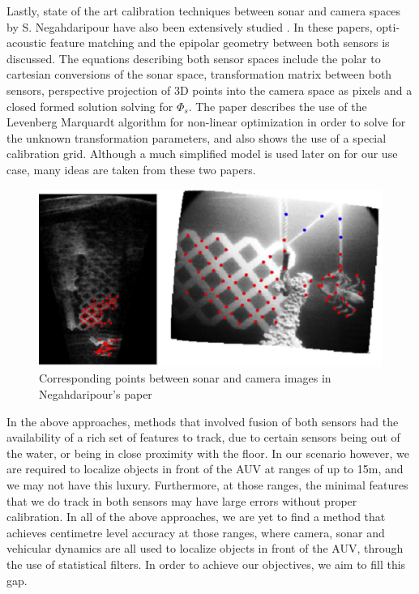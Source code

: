 \documentclass[15pt]{article}
\let\Phi\varPhi
\newcommand{\PhiSonar}{$\si{\Phi_{s}}$\xspace}
\begin{document}
Lastly, state of the art calibration techniques between sonar and camera spaces by S. Negahdaripour have also been extensively studied \cite{Negahdaripour2009} \cite{Negahdaripour2010}. In these papers, opti-acoustic feature matching and the epipolar geometry between both sensors is discussed. The equations describing both sensor spaces include the polar to cartesian conversions of the sonar space, transformation matrix between both sensors, perspective projection of 3D points into the camera space as pixels and a closed formed solution solving for \PhiSonar. The paper describes the use of the Levenberg Marquardt algorithm \cite{marquardt:1963} for non-linear optimization in order to solve for the unknown transformation parameters, and also shows the use of a special calibration grid. Although a much simplified model is used later on for our use case, many ideas are taken from these two papers.

\begin{figure}[h!]
  \centering
  \includegraphics[scale=0.3]{sonarcam}
  \captionsetup{justification=centering}
  \caption{Corresponding points between sonar and camera images in Negahdaripour's paper}
\end{figure}

In the above approaches, methods that involved fusion of both sensors had the availability of a rich set of features to track, due to certain sensors being out of the water, or being in close proximity with the floor. In our scenario however, we are required to localize objects in front of the AUV at ranges of up to 15m, and we may not have this luxury. Furthermore, at those ranges, the minimal features that we do track in both sensors may have large errors without proper calibration. In all of the above approaches, we are yet to find a method that achieves centimetre level accuracy at those ranges, where camera, sonar and vehicular dynamics are all used to localize objects in front of the AUV, through the use of statistical filters. In order to achieve our objectives, we aim to fill this gap.
\end{document}
